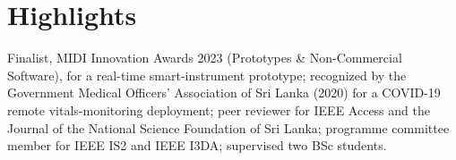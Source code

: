 \documentclass[11pt]{article}
\begin{document}
\section*{Highlights}
Finalist, MIDI Innovation Awards 2023 (Prototypes \& Non-Commercial Software), for a real-time smart-instrument prototype; recognized by the Government Medical Officers' Association of Sri Lanka (2020) for a COVID-19 remote vitals-monitoring deployment; peer reviewer for IEEE Access and the Journal of the National Science Foundation of Sri Lanka; programme committee member for IEEE IS2 and IEEE I3DA; supervised two BSc students.
\end{document}
